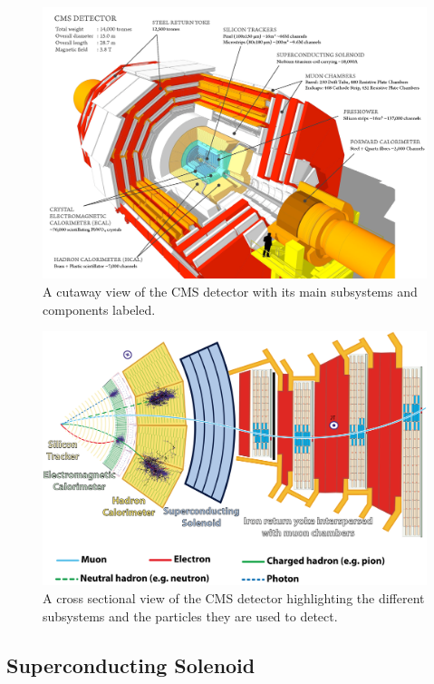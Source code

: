 \begin{figure}[htbp]
  \centering
    \includegraphics[width=5.5in]{images/cms_120918_03}
    \caption[Cutaway View of the CMS Detector]{A cutaway view of the CMS detector with its main subsystems and components labeled.\cite{CMScutaway}}
    \label{fig:CMScutaway}
\end{figure}

\begin{figure}[htbp]
  \centering
    \includegraphics[width=5.5in]{images/CMSslice_whiteBackground}
    \caption[Cross Sectional View of the CMS Detector]{A cross sectional view of the CMS detector highlighting the different subsystems and the particles they are used to detect.\cite{CMSslice}}
    \label{fig:CMSslice}
\end{figure}

\subsection{Superconducting Solenoid}

